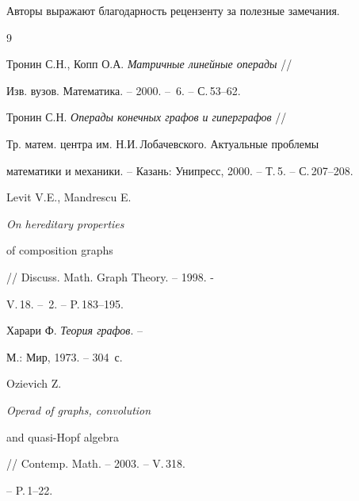 Авторы выражают благодарность рецензенту за полезные замечания.








\begin{thebibliography}{9}   \label{lit}





 Тронин С.Н., Копп О.А. {\em Матричные линейные операды} //


Изв. вузов. Математика. -- 2000. -- \No\,6. -- С.\,53--62.





 Тронин С.Н. {\em Операды конечных графов и гиперграфов} //


Тр. матем. центра им. Н.И.\,Ло\-ба\-чев\-ского. Актуальные проблемы


математики и механики. -- Казань: Унипресс, 2000. -- Т.\,5. -- С.\,207--208.





 Levit V.E., Mandrescu E. {\em On hereditary properties


of composition graphs} // Discuss. Math. Graph Theory. -- 1998. -


V.\,18. -- \No\,2. -- P.\,183--195.





 Харари Ф. {\em Теория графов}. --


М.: Мир, 1973. -- 304~с.





 Ozievich Z. {\em Operad of graphs, convolution


and quasi-Hopf algebra} // Contemp. Math. -- 2003. -- V.\,318.


-- P.\,1--22.








\end{thebibliography}





\vskip 2cm












